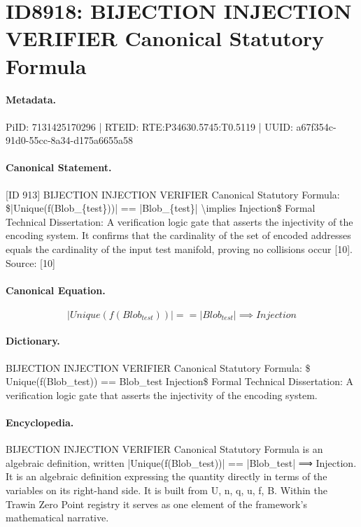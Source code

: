 \section*{ID8918: BIJECTION INJECTION VERIFIER Canonical Statutory Formula}
\paragraph{Metadata.}
PiID: 7131425170296 | RTEID: RTE:P34630.5745:T0.5119 | UUID: a67f354c-91d0-55cc-8a34-d175a6655a58

\paragraph{Canonical Statement.}
[ID 913] BIJECTION INJECTION VERIFIER Canonical Statutory Formula: \$|Unique(f(Blob\_\{test\}))| == |Blob\_\{test\}| \textbackslash{}implies Injection\$ Formal Technical Dissertation: A verification logic gate that asserts the injectivity of the encoding system. It confirms that the cardinality of the set of encoded addresses equals the cardinality of the input test manifold, proving no collisions occur [10]. Source: [10]

\paragraph{Canonical Equation.}
\[
|Unique(f(Blob_{test}))| == |Blob_{test}| \implies Injection
\]

\paragraph{Dictionary.}
BIJECTION INJECTION VERIFIER Canonical Statutory Formula: \$ Unique(f(Blob\_test)) == Blob\_test Injection\$ Formal Technical Dissertation: A verification logic gate that asserts the injectivity of the encoding system.

\paragraph{Encyclopedia.}
BIJECTION INJECTION VERIFIER Canonical Statutory Formula is an algebraic definition, written |Unique(f(Blob\_test))| == |Blob\_test| ⟹ Injection. It is an algebraic definition expressing the quantity directly in terms of the variables on its right-hand side. It is built from U, n, q, u, f, B. Within the Trawin Zero Point registry it serves as one element of the framework's mathematical narrative.
